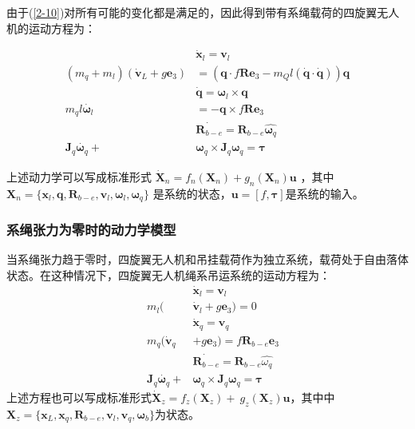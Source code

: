 \documentclass[lang=chs, degree=master, blindreview=false, winfonts=true]{yanputhesis}
\begin{document}
由于(\ref{2-10})对所有可能的变化都是满足的，因此得到带有系绳载荷的四旋翼无人机的运动方程为：

\begin{equation}
	\begin{aligned}
		&\dot{\bm x}_{l}=\bm v_{l} \\
		(m_q+m_l)(\dot{\bm v}_L+g\bm e_3)& =(\bm q\cdot f\bm R\bm e_3-m_Ql(\dot{\bm q}\cdot\dot{\bm q}))\bm q \\
		&\dot{\bm q}=\bm \omega_l\times \bm q \\
		m_{q}l \dot{\bm \omega_l}&=-\bm q\times f\bm R\bm e_{3} \\
		&\dot{\bm R_{b-e}}=\bm R_{b-e}\hat{\bm  \omega_q} \\
		\bm J_{q}\dot{\bm  \omega_q}+&\bm  \omega_q\times \bm J_{q}\bm  \omega_q=\bm \tau
	\end{aligned}
\end{equation}

上述动力学可以写成标准形式 $\dot{\bm X}_n= f_n(\bm X_n)+g_n(\bm X_n)\bm u$ ，其中 $\bm X_n = \{\bm x_l,\bm q,\bm R_{b-e},\bm v_l,\bm \omega_l,\bm \omega_q\}$ 是系统的状态，$\bm u = \left[f,\bm \tau \right]$是系统的输入。
\subsubsection{系绳张力为零时的动力学模型}
当系绳张力趋于零时，四旋翼无人机和吊挂载荷作为独立系统，载荷处于自由落体状态。在这种情况下，四旋翼无人机绳系吊运系统的运动方程为：
\begin{equation}
	\begin{aligned}
	&\dot{\bm x}_{l}=\bm v_{l}\\
	\quad m_{l}(&\dot{\bm v}_{l}+g\bm e_{3})=0\\
	&\dot{\bm x}_{q}=\bm v_{q}\\
	\quad m_{q}(\dot{\bm v}_{q}&+g\bm e_{3})=f\bm R_{b-e}\bm e_{3}\\
	&\dot{\bm R_{b-e}}=\bm R_{b-e}\hat{\omega_q}\\
	\quad \bm J_{q}\dot{\bm \omega_q}+&\bm \omega_q \times \bm J_{q}\bm \omega_q=\bm \tau
\end{aligned}
\end{equation}
上述方程也可以写成标准形式$\dot{\bm X}_z=f_z(\bm X_z)+\ g_z(\bm X_z)\bm u$，其中中$\bm X_z = \{\bm x_L,\bm x_q,\bm R_{b-e},\bm v_l,\bm v_q,\bm \omega_b\}$为状态。
\end{document}
